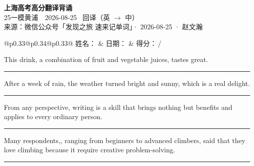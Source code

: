 \documentclass[11pt,a4paper]{article}
\newcommand{\num}[1]{\makebox[1.9em][r]{#1.}\hspace{0.3em}}
\newcommand{\wline}{\noindent\rule{\linewidth}{0.4pt}}
\begin{document}
\pagestyle{plain}
\begin{center}
{\LARGE\bfseries 上海高考高分翻译背诵 }\\[0.25em]
{\large 25一模黄浦　2026-08-25 \quad\ 回译（英 $\to$ 中）}\\[0.35em]
{\footnotesize 来源：微信公众号「发现之旅 速来记单词」· 2026-08-25 · 赵文瀚}
\end{center}

\vspace{0.4em}
\noindent\begin{tabular}{@{}p{0.33\textwidth}@{}p{0.34\textwidth}@{}p{0.33\textwidth}@{}}
姓名：\underline{\hspace{2.0cm}} & 日期：\underline{\hspace{2.0cm}} & 得分：\underline{\hspace{1.4cm}}\,/ \\
\end{tabular}

\vspace{0.5em}

\vspace{0.8em}
\num{1}This drink, a combination of fruit and vegetable juices, tastes great.

\vspace{0.25em}

\wline

\num{2}After a week of rain, the weather turned bright and sunny, which is a real delight.

\vspace{0.25em}

\wline

\num{3}From any perspective, writing is a skill that brings nothing but benefits and applies to every ordinary person.

\vspace{0.25em}

\wline

\num{4}Many respondents,, ranging from beginners to advanced climbers, said that they love climbing because it require creative problem-solving.

\vspace{0.25em}

\wline
\end{document}
